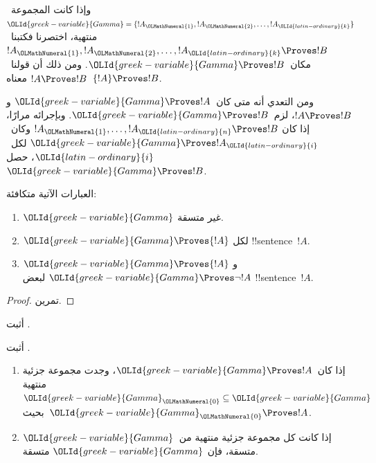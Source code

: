 \documentclass[../../../include/open-logic-section]{subfiles}
\begin{document}
وإذا كانت المجموعة~${\OLId{greek-variable}{Gamma}} = \{!A_{\OLMathNumeral{1}}, !A_{\OLMathNumeral{2}}, \ldots, !A_{\OLId{latin-ordinary}{k}}\}$ منتهية،
اختصرنا فكتبنا~$!A_{\OLMathNumeral{1}},!A_{\OLMathNumeral{2}},\ldots,!A_{\OLId{latin-ordinary}{k}} \Proves !B$
مكان~${\OLId{greek-variable}{Gamma}} \Proves !B$. ومن ذلك أن قولنا~$!A \Proves !B$
معناه~$\{!A\} \Proves !B$.

ومن التعدي أنه متى كان~${\OLId{greek-variable}{Gamma}} \Proves !A$ و$!A \Proves !B$،
لزم~${\OLId{greek-variable}{Gamma}} \Proves !B$. وبإجرائه مرارًا، إذا كان
$!A_{\OLMathNumeral{1}}, \dots, !A_{\OLId{latin-ordinary}{n}} \Proves !B$ وكان~${\OLId{greek-variable}{Gamma}} \Proves !A_{\OLId{latin-ordinary}{i}}$ لكل~${\OLId{latin-ordinary}{i}}$،
حصل~${\OLId{greek-variable}{Gamma}} \Proves !B$.

\begin{prop}
العبارات الآتية متكافئة:
    \begin{enumerate}
      \item \( {\OLId{greek-variable}{Gamma}} \) غير متسقة.
      \item \( {\OLId{greek-variable}{Gamma}} \Proves {!A} \) لكل !!{sentence}~\( {!A} \).
      \item \( {\OLId{greek-variable}{Gamma}} \Proves {!A} \) و\( {\OLId{greek-variable}{Gamma}} \Proves \lnot {!A} \) لبعض !!{sentence}~\( {!A} \).
    \end{enumerate}
\end{prop}

\begin{proof}
تمرين.
\end{proof}

\begin{prob}
أثبت .
\end{prob}
\tagendprob

\begin{prob}
أثبت .
\end{prob}
\tagendprob

\begin{prop}[التراص]
  \begin{enumerate}
  \item إذا كان~${\OLId{greek-variable}{Gamma}} \Proves !A$، وجدت مجموعة جزئية منتهية
    ${\OLId{greek-variable}{Gamma}}_{\OLMathNumeral{0}} \subseteq {\OLId{greek-variable}{Gamma}}$ بحيث~${\OLId{greek-variable}{Gamma}}_{\OLMathNumeral{0}} \Proves !A$.
  \item إذا كانت كل مجموعة جزئية منتهية من~${\OLId{greek-variable}{Gamma}}$ متسقة، فإن
    ${\OLId{greek-variable}{Gamma}}$ متسقة.
  \end{enumerate}
\end{prop}
\end{document}
